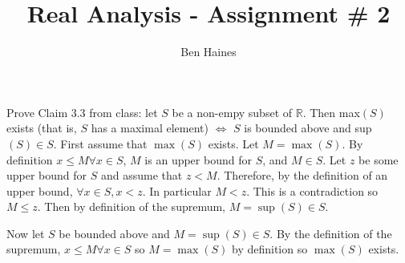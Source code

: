 \documentclass[paper=a4, fontsize=11pt]{jhwhw} %
\begin{document}
\title{Real Analysis - Assignment \# 2}
\author{Ben Haines}

Prove Claim 3.3 from class: let $S$ be a non-empy subset of $\mathbb R$. Then max$(S)$ exists (that is, $S$ has a maximal element) $\iff$ $S$ is bounded above and sup$(S)\in S$.
\solution
First assume that $\max(S)$ exists. Let $M = \max(S)$. By definition $x \le M \forall x\in S$, $M$ is an upper bound for $S$, and $M\in S$. Let $z$ be some upper bound for $S$ and assume that $z < M$. Therefore, by the definition of an upper bound, $\forall x \in S, x < z$. In particular $M < z$. This is a contradiction so $M \le z$. Then by definition of the supremum, $M = \sup(S)\in S$. 

Now let $S$ be bounded above and $M = \sup(S)\in S$. By the definition of the supremum, $x\le M \forall x\in S$ so $M = \max(S)$ by definition so $\max(S)$ exists.
\end{document}
